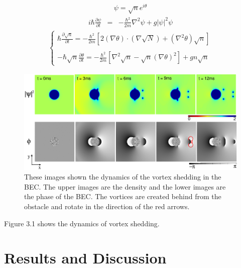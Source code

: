 \documentclass[12pt,a4paper]{report} %
\begin{document}
\begin{eqnarray}
\psi = \sqrt{n} e^{i \theta}
\end{eqnarray}
\begin{eqnarray}
i \hbar \frac{\partial \psi}{\partial t} & = & -\frac{\hbar^2}{2m} \nabla^2 \psi + g | \psi |^2 \psi
\end{eqnarray}
\begin{eqnarray}
\left \{
\begin{array}{l}
\displaystyle \hbar \frac{\partial \sqrt{n}}{\partial t} = - \frac{\hbar^2}{2m} \left[ 2 \left(\nabla \theta \right) \cdot \left( \nabla \sqrt{N} \right) + \left( \nabla^2 \theta \right) \sqrt{n} \right]
\\
\\
\displaystyle -\hbar \sqrt{n} \frac{\partial \theta}{\partial t} = - \frac{\hbar^2}{2m} \left[ \nabla^2 \sqrt{n} - \sqrt{n} \left( \nabla \theta \right)^2 \right] + gn \sqrt{n}
\end{array}
\right.
\end{eqnarray}
\begin{figure}[htbp]
\begin{center}
\includegraphics[scale=0.6,keepaspectratio]{3-1.eps}
\caption{
These images shown the dynamics of the vortex shedding in the BEC.
The upper images are the density and the lower images are the phase of the BEC.
The vortices are created behind from the obstacle and rotate in the direction of the red arrows.
}
\label{FIG:3-1}
\end{center}
\end{figure}
Figure 3.1 shows the dynamics of vortex shedding.

\newpage
\section{Results and Discussion}
\end{document}
